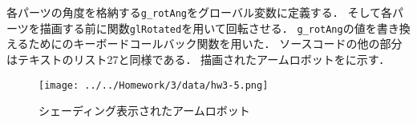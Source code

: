 

各パーツの角度を格納する\texttt{g\_rotAng}をグローバル変数に定義する．
そして各パーツを描画する前に関数\texttt{glRotated}を用いて回転させる．
\texttt{g\_rotAng}の値を書き換えるためにのキーボードコールバック関数を用いた．
ソースコードの他の部分はテキストのリスト27と同様である．
描画されたアームロボットをに示す．



\begin{figure}[htbp]
	\centering
	\texttt{[image: ../../Homework/3/data/hw3-5.png]}\\
	\caption{シェーディング表示されたアームロボット}
	\label{fig:hw3-5}
\end{figure}
